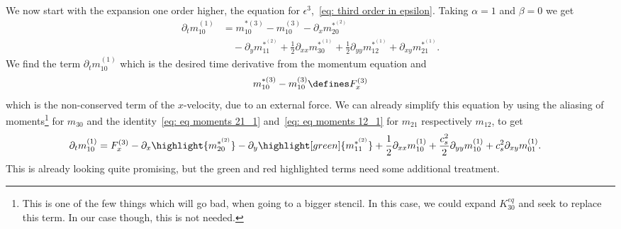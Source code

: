 We now start with the expansion one order higher, the equation for $\epsilon^3$,~\eqref{eq: third order in epsilon}.
Taking $\alpha=1$ and $\beta=0$ we get
\begin{equation}
  \begin{aligned}
     \partial_t m_{10}^{(1)} & =
    m_{10}^{*(3)} - m_{10}^{(3)} - \partial_x m_{20}^{*^{(2)}} \\
    &\quad - \partial_y m_{11}^{*^{(2)}} + \frac{1}{2}\partial_{xx} m_{30}^{*^{(1)}} + \frac{1}{2} \partial_{yy} m_{12}^{*^{(1)}} + \partial_{xy} m_{21}^{*^{(1)}}.
  \end{aligned}
\end{equation}
We find the term $\partial_t m_{10}^{(1)} $ which is the desired time derivative from the momentum equation and
\begin{equation}
  m_{10}^{*(3)} - m_{10}^{(3)}\defines F_x^{(3)}
\end{equation}
which is the non-conserved term of the $x$-velocity, due to an external force.
We can already simplify this equation by using the aliasing of moments\footnote{This is one of the few things which will go bad, when going to a bigger stencil.
In this case, we could expand $K_{30}^{eq}$ and seek to replace this term. In our case though, this is not needed.} for $m_{30}$ and the identity~\eqref{eq: eq moments 21_1} and~\eqref{eq: eq moments 12_1} for $m_{21}$ respectively $m_{12}$, to get
\begin{equation}
  \label{eq: start of momentum equation derivation}
  \begin{aligned}
    \partial_t m_{10}^{(1)} & =
    F_x^{(3)} - \partial_x \highlight{m_{20}^{*^{(2)}}} - \partial_y \highlight[green]{m_{11}^{*^{(2)}}} + \frac{1}{2}\partial_{xx} m_{10}^{(1)} + \frac{c_s^2}{2} \partial_{yy} m_{10}^{(1)} + c_s^2\partial_{xy} m_{01}^{(1)}.
  \end{aligned}
\end{equation}
This is already looking quite promising, but the green and red highlighted terms need some additional treatment.


